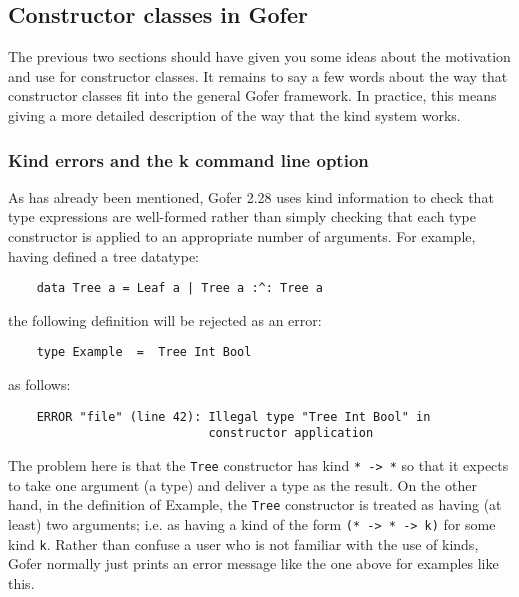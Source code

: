 \subsection{Constructor classes in Gofer}
The previous two sections should have given you some ideas about the
motivation and use for constructor classes.  It remains to say a few
words about the way that constructor classes fit into the general Gofer
framework.  In practice, this means giving a more detailed description
of the way that the kind system works.


\subsubsection{Kind errors and the k command line option}
As has already been mentioned, Gofer 2.28 uses kind information to
check that type expressions are well-formed rather than simply checking
that each type constructor is applied to an appropriate number of
arguments.  For example, having defined a tree datatype:
\begin{verbatim}
    data Tree a = Leaf a | Tree a :^: Tree a
\end{verbatim}
the following definition will be rejected as an error:
\begin{verbatim}
    type Example  =  Tree Int Bool
\end{verbatim}
as follows:
\begin{verbatim}
    ERROR "file" (line 42): Illegal type "Tree Int Bool" in
                            constructor application
\end{verbatim}
The problem here is that the \verb"Tree" constructor has kind \verb"* -> *" so that
it expects to take one argument (a type) and deliver a type as the
result.  On the other hand, in the definition of Example, the \verb"Tree"
constructor is treated as having (at least) two arguments; i.e. as
having a kind of the form \verb"(* -> * -> k)" for some kind \verb"k".  Rather than
confuse a user who is not familiar with the use of kinds, Gofer
normally just prints an error message like the one above for examples
like this.

